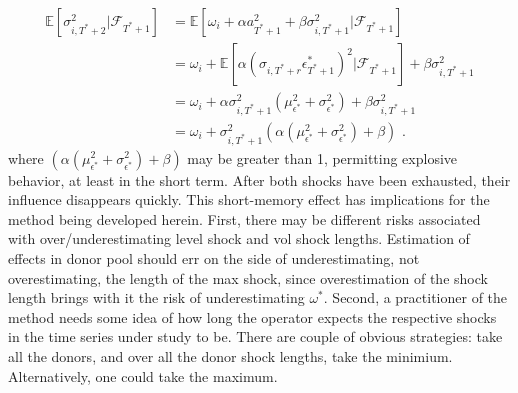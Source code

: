 \documentclass[11pt]{article}
\theoremstyle{definition}
\begin{document}
\begin{align*}
\mathbb{E}[ \sigma^{2}_{i,T^{*}+2} |\mathcal{F}_{T^{*}+1}] & = \mathbb{E}[\omega_{i} + \alpha a_{T^{*}+1}^{2} + \beta\sigma^{2}_{i,T^{*}+1} |\mathcal{F}_{T^{*}+1}] \\
& = \omega_{i} + \mathbb{E}[\alpha(\sigma_{i,T^{*}+r}\epsilon^{*}_{T^{*}+1})^{2} |\mathcal{F}_{T^{*}+1}] + \beta\sigma^{2}_{i,T^{*}+1} \\
& = \omega_{i} + \alpha\sigma^{2}_{i,T^{*}+1}(\mu^{2}_{\epsilon^{*}} + \sigma^{2}_{\epsilon^{*}}) + \beta\sigma^{2}_{i,T^{*}+1} \\
& = \omega_{i} + \sigma^{2}_{i,T^{*}+1}(\alpha(\mu^{2}_{\epsilon^{*}} + \sigma^{2}_{\epsilon^{*}}) + \beta)\text{ .}
\end{align*}
where $(\alpha(\mu^{2}_{\epsilon^{*}} + \sigma^{2}_{\epsilon^{*}}) + \beta)$ may be greater than 1, permitting explosive behavior, at least in the short term.  After both shocks have been exhausted, their influence disappears quickly.  This short-memory effect has implications for the method being developed herein.  First, there may be different risks associated with over/underestimating level shock and vol shock lengths.  Estimation of effects in donor pool should err on the side of underestimating, not overestimating, the length of the max shock, since overestimation of the shock length brings with it the risk of underestimating $\omega^{*}$.  Second, a practitioner of the method needs some idea of how long the operator expects the respective shocks in the time series under study to be.  There are couple of obvious strategies: take all the donors, and over all the donor shock lengths, take the minimium.  Alternatively, one could take the maximum.
\end{document}
